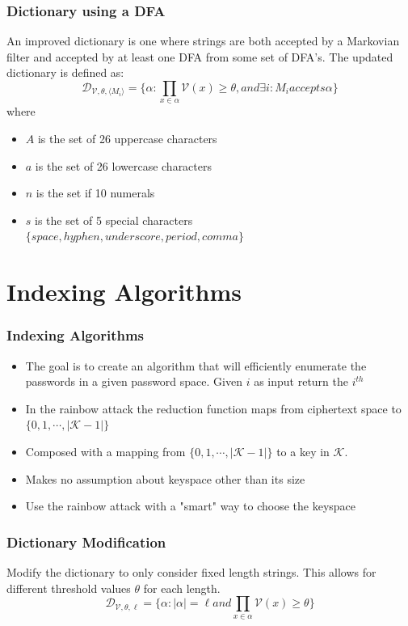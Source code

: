 \documentclass{beamer}
\newenvironment{where}{\noindent{}where\begin{itemize}}{\end{itemize}}
\DeclareMathOperator{\Exists}{\exists}
\begin{document}
\begin{frame}
\frametitle{Dictionary using a DFA} 
An improved dictionary is one where strings are both accepted by a Markovian filter and accepted by at least one DFA from some set of DFA's. The updated dictionary is defined as:
\begin{equation*}
\mathcal{D}_{\mathcal{V},\theta,\langle M_i \rangle} = \lbrace \alpha : \prod_{x \in \alpha}\mathcal{V}(x) \geq \theta, and \Exists i : M_i accepts \alpha \rbrace
\end{equation*}
\begin{where}
\item $A$ is the set of 26 uppercase characters
\item $a$ is the set of 26 lowercase characters
\item $n$ is the set if 10 numerals
\item $s$ is the set of 5 special characters $\lbrace space, hyphen, underscore, period, comma \rbrace$
\end{where}

\end{frame}

\section{Indexing Algorithms} 
\begin{frame}
\frametitle{Indexing Algorithms}
\begin{itemize}
\item The goal is to create an algorithm that will efficiently enumerate the passwords in a given password space. Given $i$ as input return the $i^{th}$
\item In the rainbow attack the reduction function maps from ciphertext space to $\lbrace 0, 1, \dotsb, \lvert \mathcal{K} - 1 \rvert \rbrace$
\item Composed with a mapping from $\lbrace 0, 1, \dotsb, \lvert \mathcal{K}-1 \rvert \rbrace$ to a key in $\mathcal{K}$.
\item Makes no assumption about keyspace other than its size
\item Use the rainbow attack with a "smart" way to choose the keyspace
\end{itemize}
\end{frame}

\begin{frame}
\frametitle{Dictionary Modification}
Modify the dictionary to only consider fixed length strings. This allows for different threshold values $\theta$ for each length.
\begin{equation*}
\mathcal{D}_{\mathcal{V},\theta,\ell} = \lbrace \alpha :  \lvert \alpha \rvert = \ell and \prod_{x \in \alpha}\mathcal{V}(x) \geq \theta \rbrace
\end{equation*}
\end{frame}
\end{document}
